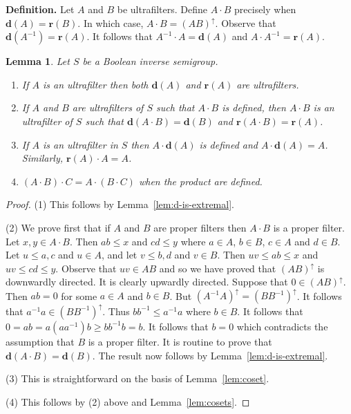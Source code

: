 \documentclass[a4paper]{amsart}
\newtheorem{lemma}[theorem]{Lemma}
\begin{document}
\noindent
{\bf Definition. }Let $A$ and $B$ be ultrafilters.
Define $A \cdot B$ precisely when $\mathbf{d}(A) = \mathbf{r}(B)$.
In which case, $A \cdot B = (AB)^{\uparrow}$.
Observe that $\mathbf{d}(A^{-1}) = \mathbf{r}(A)$.
It follows that $A^{-1} \cdot A = \mathbf{d}(A)$
and $A \cdot A^{-1} = \mathbf{r}(A)$.\\

\begin{lemma}\label{lem:product} Let $S$ be a Boolean inverse semigroup. 
\begin{enumerate}
\item If $A$ is an ultrafilter then both $\mathbf{d}(A)$ and $\mathbf{r}(A)$ are ultrafilters.
\item If $A$ and $B$ are ultrafilters of $S$ such that $A \cdot B$ is defined, 
then $A \cdot B$ is an ultrafilter of $S$ such that 
$\mathbf{d}(A \cdot B) = \mathbf{d}(B)$
and
$\mathbf{r}(A \cdot B) = \mathbf{r}(A)$.
\item If $A$ is an ultrafilter in $S$ then $A \cdot \mathbf{d}(A)$ is defined
and $A \cdot \mathbf{d}(A) = A$.
Similarly, $\mathbf{r}(A) \cdot A = A$.
\item $(A \cdot B) \cdot C = A \cdot (B \cdot C)$
when the product are defined.
\end{enumerate}
\end{lemma}
\begin{proof} 
(1) This follows by Lemma~\ref{lem:d-is-extremal}.

(2) We prove first that if $A$ and $B$ are proper filters then $A \cdot B$ is a proper filter.
Let $x, y \in A \cdot B$.
Then $ab \leq x$ and $cd \leq y$ where $a \in A$, $b \in B$, $c \in A$ and $d \in B$.
Let $u \leq a,c$ and $u \in A$, and let $v \leq b,d$ and $v \in B$.
Then $uv \leq ab \leq x$ and $uv \leq cd \leq y$.
Observe that $uv \in AB$ and so we have proved that $(AB)^{\uparrow}$ is downwardly directed.
It is clearly upwardly directed.
Suppose that $0 \in (AB)^{\uparrow}$.
Then $ab = 0$ for some $a \in A$ and $b \in B$.
But $(A^{-1}A)^{\uparrow} = (BB^{-1})^{\uparrow}$.
It follows that $a^{-1}a \in (BB^{-1})^{\uparrow}$.
Thus $bb^{-1} \leq a^{-1}a$ where $b \in B$.
It follows that $0 = ab =a(aa^{-1})b \geq  bb^{-1}b = b$.
It follows that $b = 0$ which contradicts the assumption that $B$ is a proper filter.
It is routine to prove that $\mathbf{d}(A \cdot B) = \mathbf{d}(B)$.
The result now follows by  Lemma~\ref{lem:d-is-extremal}.

(3) This is straightforward on the basis of Lemma~\ref{lem:coset}.

(4) This follows by (2) above and Lemma~\ref{lem:cosets}.
\end{proof}
\end{document}
